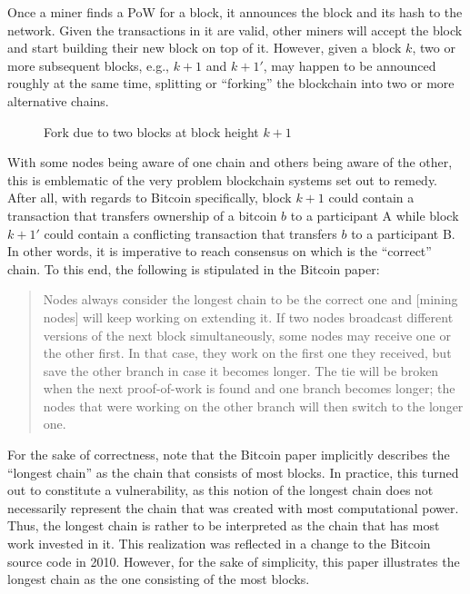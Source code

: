 Once a miner finds a PoW for a block, it announces the block and its hash to the network.
Given the transactions in it are valid, other miners will accept the block and start building their new block on top of it.
However, given a block $k$, two or more subsequent blocks, e.g., $k + 1$ and $k + 1'$, may happen to be announced roughly at the same time, splitting or ``forking'' \autocite{bitcoinwiki2015fork} the blockchain into two or more alternative chains.
\\
\begin{figure}[H]
\centering

\caption*{Fork due to two blocks at block height $k + 1$}
\end{figure}

With some nodes being aware of one chain and others being aware of the other, this is emblematic of the very problem blockchain systems set out to remedy.
After all, with regards to Bitcoin specifically, block $k + 1$ could contain a transaction that transfers ownership of a bitcoin $b$ to a participant A while block $k + 1'$ could contain a conflicting transaction that transfers $b$ to a participant B.
In other words, it is imperative to reach consensus on which is the ``correct'' chain.
To this end, the following is stipulated in the Bitcoin paper: \autocite[3]{nakamoto2008}

\begin{quote}
  Nodes always consider the longest chain to be the correct one and [mining nodes] will keep working on extending it.
  If two nodes broadcast different versions of the next block simultaneously, some nodes may receive one or the other first.
  In that case, they work on the first one they received, but save the other branch in case it becomes longer.
  The tie will be broken when the next proof-of-work is found and one branch becomes longer; the nodes that were working on the other branch will then switch to the longer one.
\end{quote}

For the sake of correctness, note that the Bitcoin paper implicitly describes the ``longest chain'' as the chain that consists of most blocks.
In practice, this turned out to constitute a vulnerability, as this notion of the longest chain does not necessarily represent the chain that was created with most computational power.
Thus, the longest chain is rather to be interpreted as the chain that has most work invested in it.
This realization was reflected in a change to the Bitcoin source code in 2010. \autocite{github2010workvsheight}
However, for the sake of simplicity, this paper illustrates the longest chain as the one consisting of the most blocks.

